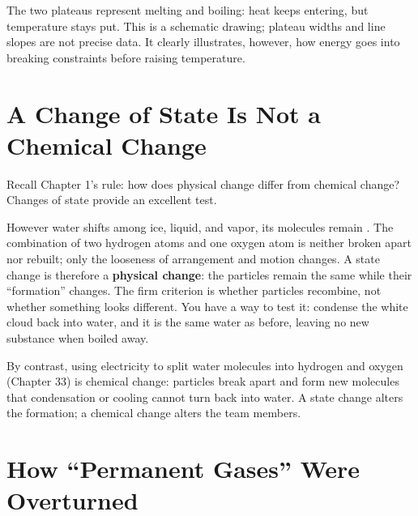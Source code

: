 The two plateaus represent melting and boiling: heat keeps entering, but temperature stays put. This is a schematic drawing; plateau widths and line slopes are not precise data. It clearly illustrates, however, how energy goes into breaking constraints before raising temperature.

\section{A Change of State Is Not a Chemical Change}

Recall Chapter 1's rule: how does physical change differ from chemical change? Changes of state provide an excellent test.

However water shifts among ice, liquid, and vapor, its molecules remain . The combination of two hydrogen atoms and one oxygen atom is neither broken apart nor rebuilt; only the looseness of arrangement and motion changes. A state change is therefore a \textbf{physical change}: the particles remain the same while their ``formation'' changes. The firm criterion is whether particles recombine, not whether something looks different. You have a way to test it: condense the white cloud back into water, and it is the same water as before, leaving no new substance when boiled away.

By contrast, using electricity to split water molecules into hydrogen and oxygen (Chapter 33) is chemical change: particles break apart and form new molecules that condensation or cooling cannot turn back into water. A state change alters the formation; a chemical change alters the team members.
\section{How ``Permanent Gases'' Were Overturned}

